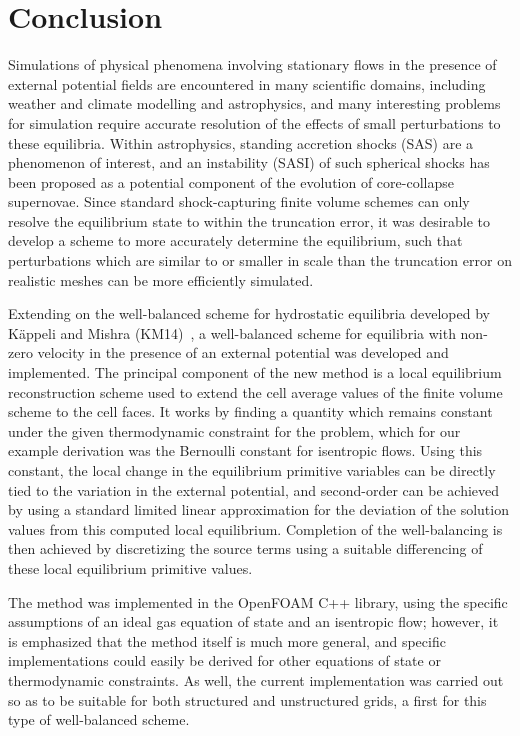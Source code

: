 \chapter{Conclusion}
\label{chap:conclusion}

Simulations of physical phenomena involving stationary flows in the presence of external potential fields are encountered in many scientific domains, including weather and climate modelling and astrophysics, and many interesting problems for simulation require accurate resolution of the effects of small perturbations to these equilibria. Within astrophysics, standing accretion shocks (SAS) are a phenomenon of interest, and an instability (SASI) of such spherical shocks has been proposed as a potential component of the evolution of core-collapse supernovae. Since standard shock-capturing finite volume schemes can only resolve the equilibrium state to within the truncation error, it was desirable to develop a scheme to more accurately determine the equilibrium, such that perturbations which are similar to or smaller in scale than the truncation error on realistic meshes can be more efficiently simulated.

Extending on the well-balanced scheme for hydrostatic equilibria developed by Käppeli and Mishra (KM14)~\cite{Kappeli2014}, a well-balanced scheme for equilibria with non-zero velocity in the presence of an external potential was developed and implemented. The principal component of the new method is a local equilibrium reconstruction scheme used to extend the cell average values of the finite volume scheme to the cell faces. It works by finding a quantity which remains constant under the given thermodynamic constraint for the problem, which for our example derivation was the Bernoulli constant for isentropic flows. Using this constant, the local change in the equilibrium primitive variables can be directly tied to the variation in the external potential, and second-order can be achieved by using a standard limited linear approximation for the deviation of the solution values from this computed local equilibrium. Completion of the well-balancing is then achieved by discretizing the source terms using a suitable differencing of these local equilibrium primitive values.

The method was implemented in the OpenFOAM C++ library, using the specific assumptions of an ideal gas equation of state and an isentropic flow; however, it is emphasized that the method itself is much more general, and specific implementations could easily be derived for other equations of state or thermodynamic constraints. As well, the current implementation was carried out so as to be suitable for both structured and unstructured grids, a first for this type of well-balanced scheme.

